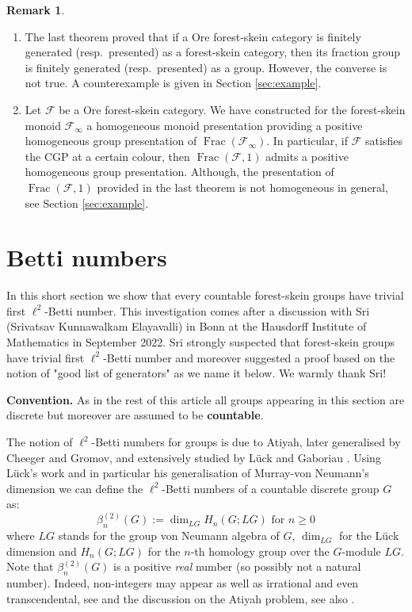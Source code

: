 \documentclass[a4paper, 12pt]{amsart}
\numberwithin{equation}{section}
\theoremstyle{definition}
\newtheorem{remark}[theorem]{Remark}
\newcommand{\cF}{\mathcal F}
\DeclareMathOperator{\Frac}{Frac}
\begin{document}
\begin{remark}
\begin{enumerate}
\item The last theorem proved that if a Ore forest-skein category is finitely generated (resp.~presented) as a forest-skein category, then its fraction group is finitely generated (resp.~presented) as a group. 
However, the converse is not true. A counterexample is given in Section \ref{sec:example}.
\item Let $\cF$ be a Ore forest-skein category. 
We have constructed for the forest-skein monoid $\cF_\infty$ a homogeneous monoid presentation providing a positive homogeneous group presentation of $\Frac(\cF_\infty)$. 
In particular, if $\cF$ satisfies the CGP at a certain colour, then $\Frac(\cF,1)$ admits a positive homogeneous group presentation.
Although, the presentation of $\Frac(\cF,1)$ provided in the last theorem is not homogeneous in general, see Section \ref{sec:example}.
\end{enumerate}
\end{remark}

\section{Betti numbers}\label{sec:Betti}

In this short section we show that every countable forest-skein groups have trivial first $\ell^2$-Betti number.
This investigation comes after a discussion with Sri (Srivatsav Kunnawalkam Elayavalli) in Bonn at the Hausdorff Institute of Mathematics in September 2022. 
Sri strongly suspected that forest-skein groups have trivial first $\ell^2$-Betti number and moreover suggested a proof based on the notion of "good list of generators" as we name it below. We warmly thank Sri!

{\bf Convention.}
As in the rest of this article all groups appearing in this section are discrete but moreover are assumed to be {\bf countable}.

The notion of $\ell^2$-Betti numbers for groups is due to Atiyah, later generalised by Cheeger and Gromov, and extensively studied by L\"uck and Gaboriau \cite{Atiyah76,Cheeger-Gromov86,Luck02,Gaboriau02}.
Using L\"uck's work and in particular his generalisation of Murray-von Neumann's dimension we can define the $\ell^2$-Betti numbers of a countable discrete group $G$ as:
$$\beta_n^{(2)}(G) := \dim_{LG} H_n(G; LG) \text{ for } n\geq 0$$
where $LG$ stands for the group von Neumann algebra of $G$, $\dim_{LG}$ for the L\"uck dimension and $H_n(G;LG)$ for the $n$-th homology group over the $G$-module $LG$.
Note that $\beta_n^{(2)}(G)$ is a positive {\it real} number (so possibly not a natural number). 
Indeed, non-integers may appear as well as irrational and even transcendental, see \cite{Pichot-Schick-Zuk15} and the discussion on the Atiyah problem, see also \cite{Lehner-Wagner13,Grabowski14}.
\end{document}
